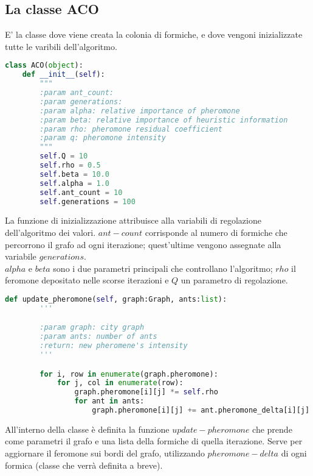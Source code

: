 \documentclass[a4paper,12pt]{report}
\begin{document}
\subsection{La classe ACO}
E' la classe dove viene creata la colonia di formiche, e dove vengoni inizializzate tutte le varibili dell'algoritmo. 
\begin{lstlisting}[language=Python]
class ACO(object):
    def __init__(self):
        """
        :param ant_count:
        :param generations:
        :param alpha: relative importance of pheromone
        :param beta: relative importance of heuristic information
        :param rho: pheromone residual coefficient
        :param q: pheromone intensity
        """
        self.Q = 10
        self.rho = 0.5
        self.beta = 10.0
        self.alpha = 1.0
        self.ant_count = 10
        self.generations = 100
\end{lstlisting}
La funzione di inizializzazione attribuisce alla variabili di regolazione dell'algoritmo dei valori.
$ant-count$ corrisponde al numero di formiche che percorrono il grafo ad ogni iterazione; quest'ultime vengono assegnate alla variabile $generations$.\\
$alpha$ e $beta$ sono i due parametri principali che controllano l'algoritmo; $rho$ il feromone depositato nelle scorse iterazioni e $Q$ un parametro di regolazione.\\
\begin{lstlisting}[language=Python]
    def update_pheromone(self, graph:Graph, ants:list):
        '''

        :param graph: city graph
        :param ants: number of ants
        :return: new pheromene's intensity
        '''

        for i, row in enumerate(graph.pheromone):
            for j, col in enumerate(row):
                graph.pheromone[i][j] *= self.rho
                for ant in ants:
                    graph.pheromone[i][j] += ant.pheromone_delta[i][j]
\end{lstlisting}
All'interno della classe è definita la funzione $update-pheromone$ che prende come parametri il grafo e una lista della formiche di quella iterazione.
Serve per aggiornare il feromone sui bordi del grafo, utilizzando $pheromone-delta$ di ogni formica (classe che verrà definita a breve).\\
\end{document}
